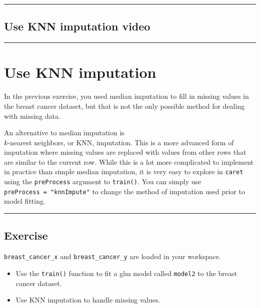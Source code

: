 \documentclass[
]{book}
\begin{document}
\begin{center}\rule{0.5\linewidth}{0.5pt}\end{center}

\hypertarget{use-knn-imputation-video}{%
\subsection*{Use KNN imputation video}\label{use-knn-imputation-video}}

\begin{center}\rule{0.5\linewidth}{0.5pt}\end{center}

\hypertarget{use-knn-imputation}{%
\section{Use KNN imputation}\label{use-knn-imputation}}

In the previous exercise, you used median imputation to fill in missing values in the breast cancer dataset, but that is not the only possible method for dealing with missing data.

An alternative to median imputation is\\
\(k\)-nearest neighbors, or KNN, imputation. This is a more advanced form of imputation where missing values are replaced with values from other rows that are similar to the current row. While this is a lot more complicated to implement in practice than simple median imputation, it is very easy to explore in \texttt{caret} using the \texttt{preProcess} argument to \texttt{train()}. You can simply use \texttt{preProcess\ =\ "knnImpute"} to change the method of imputation used prior to model fitting.

\begin{center}\rule{0.5\linewidth}{0.5pt}\end{center}

\hypertarget{exercise-24}{%
\subsection*{Exercise}\label{exercise-24}}

\texttt{breast\_cancer\_x} and \texttt{breast\_cancer\_y} are loaded in your workspace.

\begin{itemize}
\item
  Use the \texttt{train()} function to fit a glm model called \texttt{model2} to the breast cancer dataset.
\item
  Use KNN imputation to handle missing values.
\end{itemize}
\end{document}
